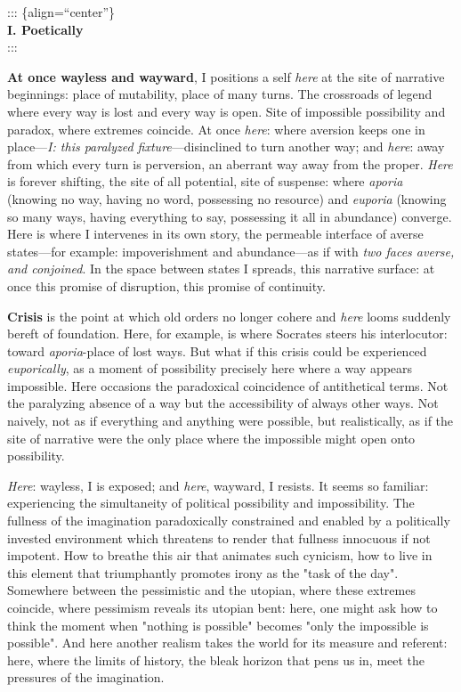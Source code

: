::: \{align=``center''\}\\
\textbf{I. Poetically}\\
:::

\textbf{At once wayless and wayward}, I positions a self \emph{here} at
the site of narrative beginnings: place of mutability, place of many
turns. The crossroads of legend where every way is lost and every way is
open. Site of impossible possibility and paradox, where extremes
coincide. At once \emph{here}: where aversion keeps one in
place---\emph{I: this paralyzed fixture}---disinclined to turn another
way; and \emph{here}: away from which every turn is perversion, an
aberrant way away from the proper. \emph{Here} is forever shifting, the
site of all potential, site of suspense: where \emph{aporia} (knowing no
way, having no word, possessing no resource) and \emph{euporia} (knowing
so many ways, having everything to say, possessing it all in abundance)
converge. Here is where I intervenes in its own story, the permeable
interface of averse states---for example: impoverishment and
abundance---as if with \emph{two faces averse, and conjoined}. In the
space between states I spreads, this narrative surface: at once this
promise of disruption, this promise of continuity.

\textbf{Crisis} is the point at which old orders no longer cohere and
\emph{here} looms suddenly bereft of foundation. Here, for example, is
where Socrates steers his interlocutor: toward \emph{aporia}-place of
lost ways. But what if this crisis could be experienced
\emph{euporically}, as a moment of possibility precisely here where a
way appears impossible. Here occasions the paradoxical coincidence of
antithetical terms. Not the paralyzing absence of a way but the
accessibility of always other ways. Not naively, not as if everything
and anything were possible, but realistically, as if the site of
narrative were the only place where the impossible might open onto
possibility.

\emph{Here}: wayless, I is exposed; and \emph{here}, wayward, I resists.
It seems so familiar: experiencing the simultaneity of political
possibility and impossibility. The fullness of the imagination
paradoxically constrained and enabled by a politically invested
environment which threatens to render that fullness innocuous if not
impotent. How to breathe this air that animates such cynicism, how to
live in this element that triumphantly promotes irony as the "task of
the day". Somewhere between the pessimistic and the utopian, where these
extremes coincide, where pessimism reveals its utopian bent: here, one
might ask how to think the moment when "nothing is possible" becomes
"only the impossible is possible". And here another realism takes the
world for its measure and referent: here, where the limits of history,
the bleak horizon that pens us in, meet the pressures of the
imagination.

